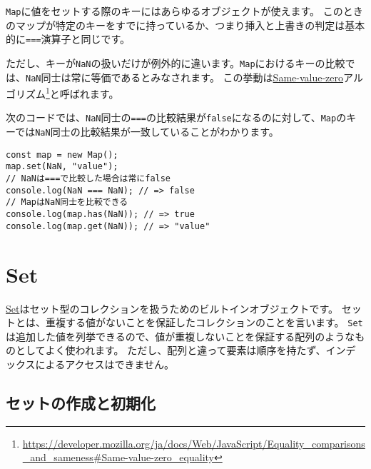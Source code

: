 \begin{tcolorbox}[enhanced jigsaw,breakable,title=キーの等価性とNaN]\label{key-and-nan}

\texttt{Map}に値をセットする際のキーにはあらゆるオブジェクトが使えます。
このときのマップが特定のキーをすでに持っているか、つまり挿入と上書きの判定は基本的に\texttt{===}演算子と同じです。

ただし、キーが\texttt{NaN}の扱いだけが例外的に違います。\texttt{Map}におけるキーの比較では、\texttt{NaN}同士は常に等価であるとみなされます。
この挙動は\href{https://developer.mozilla.org/ja/docs/Web/JavaScript/Equality_comparisons_and_sameness\#Same-value-zero_equality}{Same-value-zero}アルゴリズム\footnote{\url{https://developer.mozilla.org/ja/docs/Web/JavaScript/Equality_comparisons_and_sameness\#Same-value-zero_equality}}と呼ばれます。

次のコードでは、\texttt{NaN}同士の\texttt{===}の比較結果が\texttt{false}になるのに対して、\texttt{Map}のキーでは\texttt{NaN}同士の比較結果が一致していることがわかります。

\begin{lstlisting}
const map = new Map();
map.set(NaN, "value");
// NaNは===で比較した場合は常にfalse
console.log(NaN === NaN); // => false
// MapはNaN同士を比較できる
console.log(map.has(NaN)); // => true
console.log(map.get(NaN)); // => "value"
\end{lstlisting}
\end{tcolorbox}

\hypertarget{set}{%
\section{Set}\label{set}}

\href{https://developer.mozilla.org/ja/docs/Web/JavaScript/Reference/Global_Objects/Set}{Set}はセット型のコレクションを扱うためのビルトインオブジェクトです。
セットとは、重複する値がないことを保証したコレクションのことを言います。
\texttt{Set}は追加した値を列挙できるので、値が重複しないことを保証する配列のようなものとしてよく使われます。
ただし、配列と違って要素は順序を持たず、インデックスによるアクセスはできません。

\hypertarget{set-new}{%
\subsection{セットの作成と初期化}\label{set-new}}

